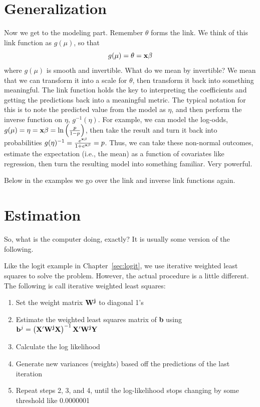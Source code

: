 \section{Generalization}

Now we get to the modeling part. Remember $\theta$ forms the link. We think of this link function as $g(\mu)$, so that
\[
g(\mu) = \theta = {\bf x\beta}
\]
where $g(\mu)$ is smooth and invertible. What do we mean by invertible? We mean that we can transform it into a scale for $\theta$, then transform it back into something meaningful. The link function holds the key to interpreting the coefficients and getting the predictions back into a meaningful metric. The typical notation for this is to note the predicted value from the model as $\eta$, and then perform the inverse function on $\eta$, $g^{-1}(\eta)$.  For example, we can model the log-odds, $g(\mu)=\eta = {\bf x\beta}=\mbox{ln}\left(\frac{p}{1-p}\right)$, then take the result and turn it back into probabilities $g(\eta)^{-1}=\frac{e^{\bf x\beta}}{1+e^{\bf x\beta}}=p$. Thus, we can take these non-normal outcomes, estimate the expectation (i.e., the mean) as a function of covariates like regression, then turn the resulting model into something familiar. Very powerful.

Below in the examples we go over the link and inverse link functions again.

\section{Estimation}
\label{sec:glmestimation}

So, what is the computer doing, exactly? It is usually some version of the following.

Like the logit example in Chapter~\ref{sec:logit}, we use iterative weighted least squares to solve the problem.  However, the actual procedure is a little different.  The following is call iterative weighted least squares:

\begin{enumerate}
\item{Set the weight matrix ${\bf W^j}$ to diagonal 1's}
\item{Estimate the weighted least squares matrix of {\bf b} using ${\bf b}^j=\left({\bf X'W^jX}\right)^{-1}{\bf X'W^jY}$}
\item{Calculate the log likelihood}
\item{Generate new variances (weights) based off the predictions of the last iteration}
\item{Repeat steps 2, 3, and 4, until the log-likelihood stops changing by some threshold like 0.0000001}
\end{enumerate}

